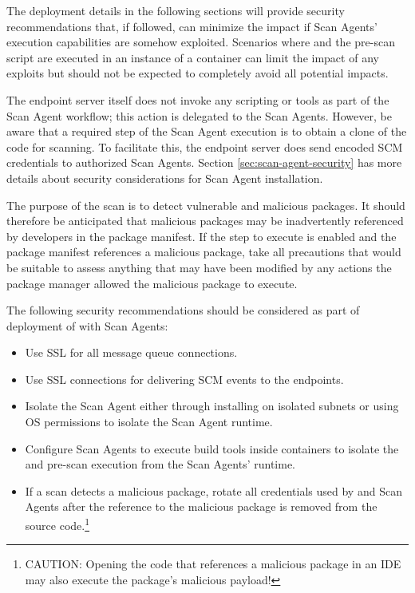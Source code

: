 The deployment details in the following sections will provide security recommendations
that, if followed, can minimize the impact if Scan Agents' execution
capabilities are somehow exploited.  Scenarios where \scaresolver and the pre-scan script are executed in
an instance of a container can limit the impact of any exploits but should not be expected
to completely avoid all potential impacts. 

The \cxoneflow endpoint server itself does not invoke any scripting or tools as part of the 
Scan Agent workflow; this action is delegated to the Scan Agents.  However, be aware that a required step of the
Scan Agent execution is to obtain a clone of the code for scanning.  To facilitate this,
the \cxoneflow endpoint server does send encoded SCM credentials to authorized
Scan Agents.  Section \ref{sec:scan-agent-security} has more details
about security considerations for Scan Agent installation.

The purpose of the \scaresolver scan is to detect vulnerable and malicious packages. It
should therefore be anticipated that malicious packages may be inadvertently referenced
by developers in the package manifest.  If the step to execute \scaresolver is enabled
and the package manifest references a malicious package, take all precautions that
would be suitable to assess anything that may have been modified by any actions the package
manager allowed the malicious package to execute.

The following security recommendations should be considered as part of deployment of \cxoneflow with Scan Agents:
\begin{itemize}
  \item Use SSL for all message queue connections.
  \item Use SSL connections for delivering SCM events to the \cxoneflow endpoints.
  \item Isolate the Scan Agent either through installing on isolated subnets or using OS permissions to
  isolate the Scan Agent runtime.
  \item Configure Scan Agents to execute build tools inside containers to isolate the \scaresolver and pre-scan execution from
  the Scan Agents' runtime.
  \item If a scan detects a malicious package, rotate all credentials used by \cxoneflow and Scan Agents
  after the reference to the malicious package is removed from the source code.\footnote{CAUTION: Opening the code that
  references a malicious package in an IDE may also execute the package's malicious payload!}
\end{itemize}




